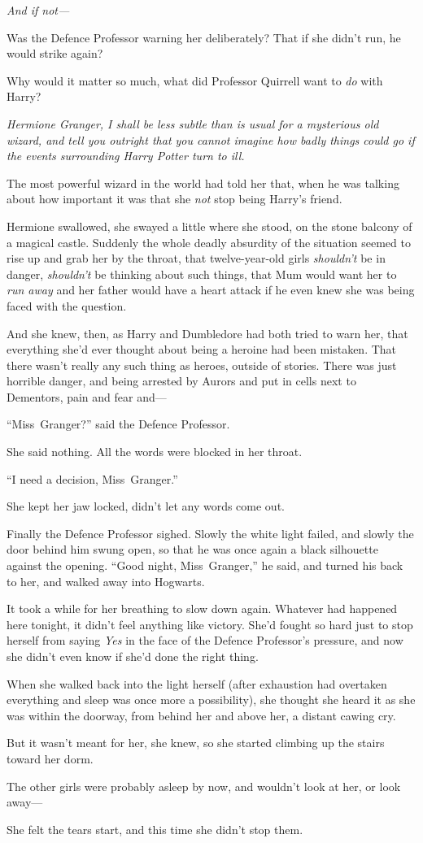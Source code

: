\emph{And if not—}

Was the Defence Professor warning her deliberately? That if she didn’t run, he would strike again?

Why would it matter so much, what did Professor Quirrell want to \emph{do} with Harry?

\emph{Hermione Granger, I shall be less subtle than is usual for a mysterious old wizard, and tell you outright that you cannot \emph{imagine} how badly things could go if the events surrounding Harry Potter turn to ill.}

The most powerful wizard in the world had told her that, when he was talking about how important it was that she \emph{not} stop being Harry’s friend.

Hermione swallowed, she swayed a little where she stood, on the stone balcony of a magical castle. Suddenly the whole deadly absurdity of the situation seemed to rise up and grab her by the throat, that twelve-year-old girls \emph{shouldn’t} be in danger, \emph{shouldn’t} be thinking about such things, that Mum would want her to \emph{run away} and her father would have a heart attack if he even knew she was being faced with the question.

And she knew, then, as Harry and Dumbledore had both tried to warn her, that everything she’d ever thought about being a heroine had been mistaken. That there wasn’t really any such thing as heroes, outside of stories. There was just horrible danger, and being arrested by Aurors and put in cells next to Dementors, pain and fear and—

“Miss~Granger?” said the Defence Professor.

She said nothing. All the words were blocked in her throat.

“I need a decision, Miss~Granger.”

She kept her jaw locked, didn’t let any words come out.

Finally the Defence Professor sighed. Slowly the white light failed, and slowly the door behind him swung open, so that he was once again a black silhouette against the opening. “Good night, Miss~Granger,” he said, and turned his back to her, and walked away into Hogwarts.

It took a while for her breathing to slow down again. Whatever had happened here tonight, it didn’t feel anything like victory. She’d fought so hard just to stop herself from saying \emph{Yes} in the face of the Defence Professor’s pressure, and now she didn’t even know if she’d done the right thing.

When she walked back into the light herself (after exhaustion had overtaken everything and sleep was once more a possibility), she thought she heard it as she was within the doorway, from behind her and above her, a distant cawing cry.

But it wasn’t meant for her, she knew, so she started climbing up the stairs toward her dorm.

The other girls were probably asleep by now, and wouldn’t look at her, or look away—

She felt the tears start, and this time she didn’t stop them.

